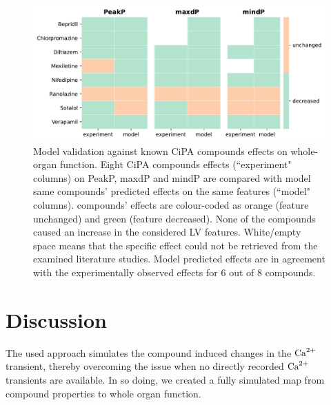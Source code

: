 \begin{figure}[ht!]
    \myfloatalign
    \includegraphics[width=\textwidth]{figures/chapter06/model_vs_experiments.pdf}
    \caption{Model validation against known CiPA compounds effects on whole-organ function. Eight CiPA compounds effects (``experiment" columns) on PeakP, maxdP and mindP are compared with model same compounds' predicted effects on the same features (``model" columns). compounds' effects are colour-coded as orange (feature unchanged) and green (feature decreased). None of the compounds caused an increase in the considered LV features. White/empty space means that the specific effect could not be retrieved from the examined literature studies. Model predicted effects are in agreement with the experimentally observed effects for $6$ out of $8$ compounds.}
    \label{fig:validationtable}
\end{figure}


%
%
%
\section{Discussion}\label{sec:ch6discussion}
The used approach simulates the compound induced changes in the $\textrm{Ca}^{2+}$ transient, thereby overcoming the issue when no directly recorded $\textrm{Ca}^{2+}$ transients are available. In so doing, we created a fully simulated map from compound properties to whole organ function. 


%
%
%
